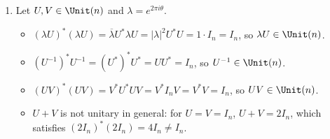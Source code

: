 \begin{exercisesolution}
\begin{enumerate}[label=\textbf{(\alph*)}]
    \item Let $U, V \in \Unit(n)$ and $\lambda = e^{2\pi i \theta}$.
    \begin{itemize}
        \item $(\lambda U)^* (\lambda U) = \overline{\lambda} U^* \lambda U = |\lambda|^2 U^* U = 1 \cdot I_n = I_n$, so $\lambda U \in \Unit(n)$.
        \item $(U^{-1})^* U^{-1} = (U^*)^* U^* = U U^* = I_n$, so $U^{-1} \in \Unit(n)$.
        \item $(UV)^* (UV) = V^* U^* U V = V^* I_n V = V^* V = I_n$, so $UV \in \Unit(n)$.
        \item $U + V$ is not unitary in general: for $U = V = I_n$, $U + V = 2I_n$, which satisfies $(2I_n)^*(2I_n) = 4I_n \ne I_n$. \qedhere
    \end{itemize}
\end{enumerate}
\end{exercisesolution}

